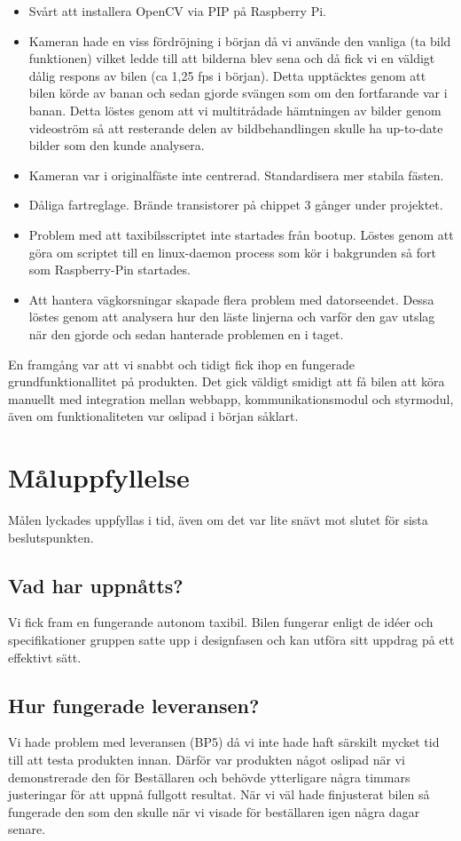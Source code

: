 \documentclass[10pt,oneside,swedish]{lips}
\begin{document}
\begin{itemize}
    \item Svårt att installera OpenCV via PIP på Raspberry Pi.
    \item Kameran hade en viss fördröjning i början då vi använde den vanliga (ta bild funktionen) vilket ledde till att bilderna blev sena och då fick vi en väldigt dålig respons av bilen (ca 1,25 fps i början). Detta upptäcktes genom att bilen körde av banan och sedan gjorde svängen som om den fortfarande var i banan. Detta löstes genom att vi multitrådade hämtningen av bilder genom videoström så att resterande delen av bildbehandlingen skulle ha up-to-date bilder som den kunde analysera.
    \item Kameran var i originalfäste inte centrerad. Standardisera mer stabila fästen.
    \item Dåliga fartreglage. Brände transistorer på chippet 3 gånger under projektet.
    \item Problem med att taxibilsscriptet inte startades från bootup. Löstes genom att göra om scriptet till en linux-daemon process som kör i bakgrunden så fort som Raspberry-Pin startades.
    \item Att hantera vägkorsningar skapade flera problem med datorseendet. Dessa löstes genom att analysera hur den läste linjerna och varför den gav utslag när den gjorde och sedan hanterade problemen en i taget.
\end{itemize}

En framgång var att vi snabbt och tidigt fick ihop en fungerade grundfunktionallitet på produkten. Det gick väldigt smidigt att få bilen att köra manuellt med integration mellan webbapp, kommunikationsmodul och styrmodul, även om funktionaliteten var oslipad i början såklart.

\section{Måluppfyllelse}
Målen lyckades uppfyllas i tid, även om det var lite snävt mot slutet för sista beslutspunkten.

\subsection{Vad har uppnåtts?}
Vi fick fram en fungerande autonom taxibil. Bilen fungerar enligt de idéer och specifikationer gruppen satte upp i designfasen och kan utföra sitt uppdrag på ett effektivt sätt.

\subsection{Hur fungerade leveransen?}
Vi hade problem med leveransen (BP5) då vi inte hade haft särskilt mycket tid till att testa produkten innan. Därför var produkten något oslipad när vi demonstrerade den för Beställaren och behövde ytterligare några timmars justeringar för att uppnå fullgott resultat. När vi väl hade finjusterat bilen så fungerade den som den skulle när vi visade för beställaren igen några dagar senare.
\end{document}
